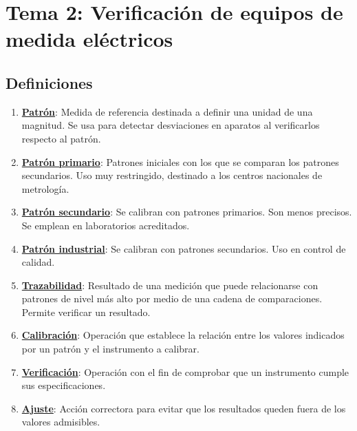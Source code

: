 \section{Tema 2: Verificación de equipos de medida eléctricos}
\subsection{Definiciones}
\begin{enumerate}
	\item \underline{\textbf{Patrón}}: Medida de referencia destinada a definir una unidad de una magnitud. Se usa para detectar desviaciones en aparatos al verificarlos respecto al patrón.
	\item \underline{\textbf{Patrón primario}}: Patrones iniciales con los que se comparan los patrones secundarios. Uso muy restringido, destinado a los  centros nacionales de metrología.
	\item \underline{\textbf{Patrón secundario}}: Se calibran con patrones primarios. Son menos precisos. Se emplean en laboratorios acreditados. 
	\item \underline{\textbf{Patrón industrial}}: Se calibran con patrones secundarios. Uso en control de calidad. 
	\item \underline{\textbf{Trazabilidad}}: Resultado de una medición que puede relacionarse con patrones de nivel más alto por medio de una cadena de comparaciones. Permite verificar un resultado.
	\item \underline{\textbf{Calibración}}: Operación que establece la relación entre los valores indicados por un patrón y el instrumento a calibrar. 
	\item \underline{\textbf{Verificación}}: Operación con el fin de comprobar que un instrumento cumple sus especificaciones.
	\item \underline{\textbf{Ajuste}}: Acción correctora para evitar que los resultados queden fuera de los valores admisibles.
\end{enumerate}
